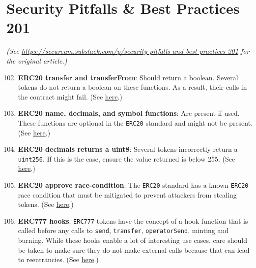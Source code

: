 \section{Security Pitfalls \& Best Practices 201}

\textit{(See \url{https://secureum.substack.com/p/security-pitfalls-and-best-practices-201} for the original article.)}\\

\begin{enumerate}
\setcounter{enumi}{101}
\item\textbf{ERC20 transfer and transferFrom}: Should return a boolean. Several tokens do not return a boolean on these functions. As a result, their calls in the contract might fail. (See \href{https://github.com/crytic/building-secure-contracts/blob/master/development-guidelines/token\_integration.md\#erc-conformity}{here}.)

\item\textbf{ERC20 name, decimals, and symbol functions}: Are present if used. These functions are optional in the \verb|ERC20| standard and might not be present. (See \href{https://github.com/crytic/building-secure-contracts/blob/master/development-guidelines/token\_integration.md\#erc-conformity}{here}.)

\item\textbf{ERC20 decimals returns a uint8}: Several tokens incorrectly return a \verb|uint256|. If this is the case, ensure the value returned is below 255. (See \href{https://github.com/crytic/building-secure-contracts/blob/master/development-guidelines/token\_integration.md\#erc-conformity}{here}.)

\item\textbf{ERC20 approve race-condition}: The \verb|ERC20| standard has a known \verb|ERC20| race condition that must be mitigated to prevent attackers from stealing tokens. (See \href{https://github.com/ethereum/EIPs/issues/20\#issuecomment-263524729}{here}.)

\item\textbf{ERC777 hooks}: \verb|ERC777| tokens have the concept of a hook function that is called before any calls to \verb|send|, \verb|transfer|, \verb|operatorSend|, minting and burning. While these hooks enable a lot of interesting use cases, care should be taken to make sure they do not make external calls because that can lead to reentrancies. (See \href{https://github.com/crytic/building-secure-contracts/blob/master/development-guidelines/token\_integration.md\#erc-conformity}{here}.)


\end{enumerate}
